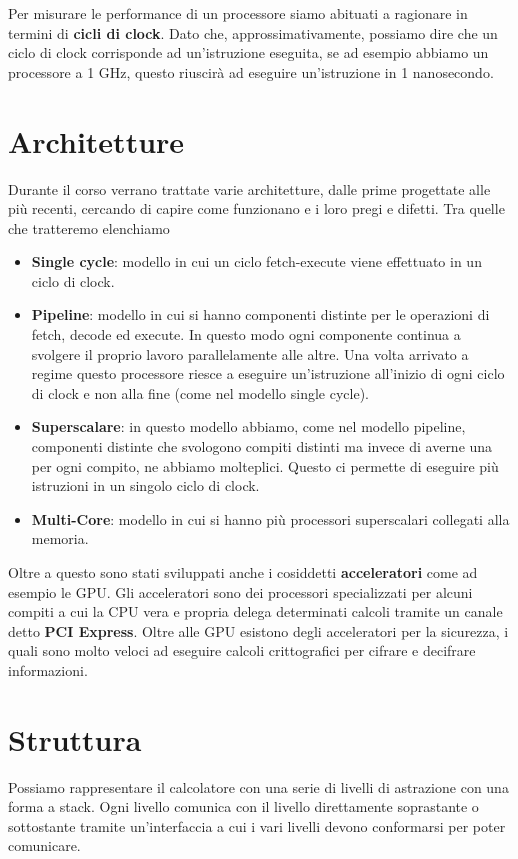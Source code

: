 Per misurare le performance di un processore siamo abituati a ragionare in termini di
\textbf{cicli di clock}. Dato che, approssimativamente, possiamo dire che un ciclo di clock
corrisponde ad un'istruzione eseguita, se ad esempio abbiamo un processore a 1 GHz, questo riuscirà
ad eseguire un'istruzione in 1 nanosecondo.

\section*{Architetture}
Durante il corso verrano trattate varie architetture, dalle prime progettate alle più recenti,
cercando di capire come funzionano e i loro pregi e difetti. Tra quelle che tratteremo elenchiamo
\begin{itemize}
	\item \textbf{Single cycle}: modello in cui un ciclo fetch-execute viene effettuato in un ciclo
	      di clock.
	\item \textbf{Pipeline}: modello in cui si hanno componenti distinte per le operazioni di fetch,
	      decode ed execute. In questo modo ogni componente continua a svolgere il proprio lavoro
	      parallelamente alle altre. Una volta arrivato a regime questo processore riesce a
	      eseguire un'istruzione all'inizio di ogni ciclo di clock e non alla fine (come nel
	      modello single cycle).
	\item \textbf{Superscalare}: in questo modello abbiamo, come nel modello pipeline, componenti
	      distinte che svologono compiti distinti ma invece di averne una per ogni compito, ne
	      abbiamo molteplici. Questo ci permette di eseguire più istruzioni in un singolo ciclo
	      di clock.
	\item \textbf{Multi-Core}: modello in cui si hanno più processori superscalari collegati alla
	      memoria.
\end{itemize}

Oltre a questo sono stati sviluppati anche i cosiddetti \textbf{acceleratori} come ad esempio le
GPU. Gli acceleratori sono dei processori specializzati per alcuni compiti a cui la CPU vera e
propria delega determinati calcoli tramite un canale detto \textbf{PCI Express}. Oltre alle GPU
esistono degli acceleratori per la sicurezza, i quali sono molto veloci ad eseguire calcoli
crittografici per cifrare e decifrare informazioni.

\section*{Struttura}
Possiamo rappresentare il calcolatore con una serie di livelli di astrazione con una forma a stack.
Ogni livello comunica con il livello direttamente soprastante o sottostante tramite un'interfaccia
a cui i vari livelli devono conformarsi per poter comunicare.

